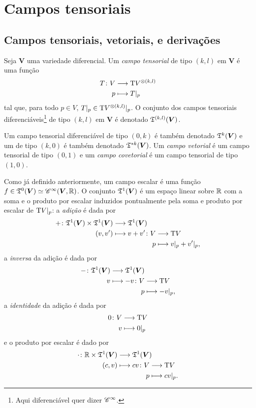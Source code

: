 \section{Campos tensoriais}

\subsection{Campos tensoriais, vetoriais, e derivações}

\begin{definition}
Seja $\bm V$ uma variedade diferencial. Um \emph{campo tensorial} de tipo $(k,l)$ em $\bm V$ é uma função
	\begin{align*}
	{T}\colon {V} &\longrightarrow {\mathrm{T}V^{\otimes(k,l)}} \\{p} &\longmapsto T|_p
	\end{align*}
tal que, para todo $p \in V$, $T|_p \in \mathrm{T} V^{\otimes(k,l)}|_p$. O conjunto dos campos tensoriais diferenciáveis\footnote{Aqui diferenciável quer dizer $\mathscr{C}^\infty$.} de tipo $(k,l)$ em $\bm V$ é denotado $\mathfrak{T}^{(k,l)}(\bm V)$.

Um campo tensorial diferenciável de tipo $(0,k)$ é também denotado $\mathfrak{T}^k(\bm V)$ e um de tipo $(k,0)$ é também denotado $\mathfrak{T}^{* k}(\bm V)$.
Um \emph{campo vetorial} é um campo tensorial de tipo $(0,1)$ e um \emph{campo covetorial} é um campo tensorial de tipo $(1,0)$.
\end{definition}

Como já definido anteriormente, um campo escalar é uma função $f \in \mathfrak{T}^0(\bm V) \simeq \mathscr{C}^{\infty}(\bm V,\mathbb{R})$. O conjunto $\mathfrak{T}^1(\bm V)$ é um espaço linear sobre $\mathbb{R}$ com a soma e o produto por escalar induzidos pontualmente pela soma e produto por escalar de $\mathrm{T} V|_p$: a \emph{adição} é dada por
	\begin{align*}
	\func{+}{\tens^1(\bm V) \times \tens^1(\bm V)}{\tens^1(\bm V)}{(v,v')}{
		\begin{aligned}[t]
		\func{v+v'}{V}{\Tg V}{p}{v|_p + v'|_p},
		\end{aligned}
	}
	\end{align*}
a \emph{inversa} da adição é dada por
	\begin{align*}
	\func{-}{\tens^1(\bm V)}{\tens^1(\bm V)}{v}{
		\begin{aligned}[t]
			\func{-v}{V}{\Tg V}{p}{-v|_p},
		\end{aligned}
	}
	\end{align*}
a \emph{identidade} da adição é dada por
	\begin{align*}
	\func{0}{V}{\Tg V}{v}{0|_p}
	\end{align*}
e o produto por escalar é dado por
	\begin{align*}
	\func{\cdot}{\R \times \tens^1(\bm V)}{\tens^1(\bm V)}{(c,v)}{
		\begin{aligned}[t]
		\func{cv}{V}{\Tg V}{p}{cv|_p.}
		\end{aligned}
	}
	\end{align*}

